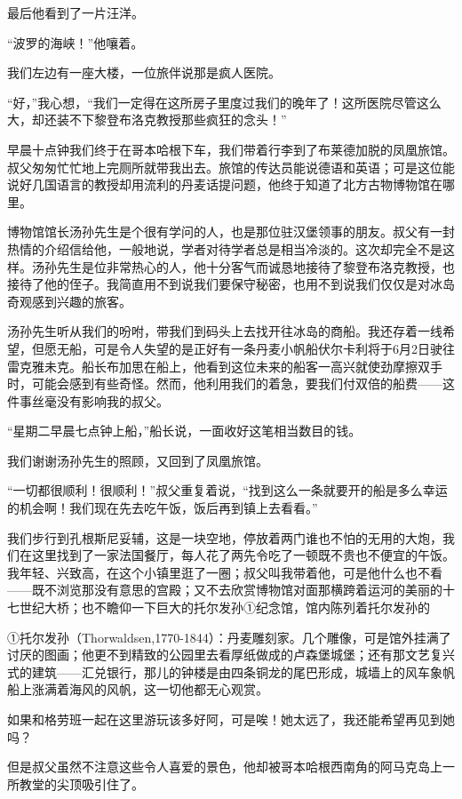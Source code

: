 \documentclass[10pt]{book}
\begin{document}
最后他看到了一片汪洋。

“波罗的海峡！”他嚷着。

我们左边有一座大楼，一位旅伴说那是疯人医院。

“好，”我心想，“我们一定得在这所房子里度过我们的晚年了！这所医院尽管这么大，却还装不下黎登布洛克教授那些疯狂的念头！”

早晨十点钟我们终于在哥本哈根下车，我们带着行李到了布莱德加脱的凤凰旅馆。叔父匆匆忙忙地上完厕所就带我出去。旅馆的传达员能说德语和英语；可是这位能说好几国语言的教授却用流利的丹麦话提问题，他终于知道了北方古物博物馆在哪里。

博物馆馆长汤孙先生是个很有学问的人，也是那位驻汉堡领事的朋友。叔父有一封热情的介绍信给他，一般地说，学者对待学者总是相当冷淡的。这次却完全不是这样。汤孙先生是位非常热心的人，他十分客气而诚恳地接待了黎登布洛克教授，也接待了他的侄子。我简直用不到说我们要保守秘密，也用不到说我们仅仅是对冰岛奇观感到兴趣的旅客。

汤孙先生听从我们的吩咐，带我们到码头上去找开往冰岛的商船。我还存着一线希望，但愿无船，可是令人失望的是正好有一条丹麦小帆船伏尔卡利将于6月2日驶往雷克雅未克。船长布加思在船上，他看到这位未来的船客一高兴就使劲摩擦双手时，可能会感到有些奇怪。然而，他利用我们的着急，要我们付双倍的船费——这件事丝毫没有影响我的叔父。

“星期二早晨七点钟上船，”船长说，一面收好这笔相当数目的钱。

我们谢谢汤孙先生的照顾，又回到了凤凰旅馆。

“一切都很顺利！很顺利！”叔父重复着说，“找到这么一条就要开的船是多么幸运的机会啊！我们现在先去吃午饭，饭后再到镇上去看看。”

我们步行到孔根斯尼妥辅，这是一块空地，停放着两门谁也不怕的无用的大炮，我们在这里找到了一家法国餐厅，每人花了两先令吃了一顿既不贵也不便宜的午饭。我年轻、兴致高，在这个小镇里逛了一圈；叔父叫我带着他，可是他什么也不看——既不浏览那没有意思的宫殿；又不去欣赏博物馆对面那横跨着运河的美丽的十七世纪大桥；也不瞻仰一下巨大的托尔发孙①纪念馆，馆内陈列着托尔发孙的

①托尔发孙（Thorwaldsen,1770-1844）：丹麦雕刻家。几个雕像，可是馆外挂满了讨厌的图画；他更不到精致的公园里去看厚纸做成的卢森堡城堡；还有那文艺复兴式的建筑——汇兑银行，那儿的钟楼是由四条铜龙的尾巴形成，城墙上的风车象帆船上涨满着海风的风帆，这一切他都无心观赏。

如果和格劳班一起在这里游玩该多好阿，可是唉！她太远了，我还能希望再见到她吗？

但是叔父虽然不注意这些令人喜爱的景色，他却被哥本哈根西南角的阿马克岛上一所教堂的尖顶吸引住了。
\end{document}
